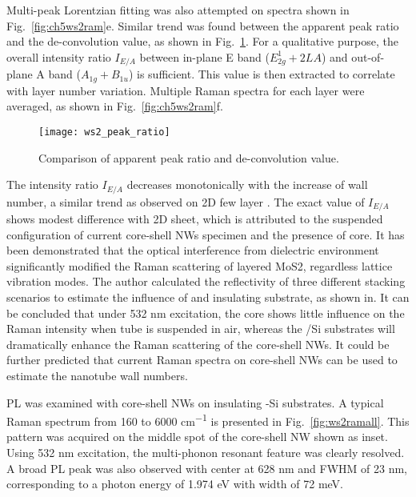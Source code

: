 Multi-peak Lorentzian fitting was also attempted on spectra shown in Fig.~\ref{fig:ch5ws2ram}e. Similar trend was found between the apparent peak ratio and the de-convolution value, as shown in Fig.~\ref{fig:ch5ws2pr}. For a qualitative purpose, the overall intensity ratio $I_{E/A}$ between in-plane E band ($E_{2g}^1+2LA$) and out-of-plane A band ($A_{1g}+B_{1u}$) is sufficient. This value is then extracted to correlate with layer number variation. Multiple Raman spectra for each layer were averaged, as shown in Fig.~\ref{fig:ch5ws2ram}f. 

\begin{figure}[htb]
\centering
\texttt{[image: ws2\_peak\_ratio]}
\caption[Multi-peak Lorentzian fitting on core-shell NWs]{Comparison of apparent peak ratio and de-convolution value.}
\label{fig:ch5ws2pr}
\end{figure}

The intensity ratio $I_{E/A}$ decreases monotonically with the increase of  wall number, a similar trend as observed on 2D few layer . The exact value of $I_{E/A}$ shows modest difference with 2D sheet, which is attributed to the suspended configuration of current core-shell NWs specimen and the presence of  core. It has been demonstrated that the optical interference from dielectric environment significantly modified the Raman scattering of layered MoS2, regardless lattice vibration modes.\cite{Li2012} The author calculated the reflectivity of three different stacking scenarios to estimate the influence of  and insulating substrate, as shown in. It can be concluded that under 532 nm excitation, the  core shows little influence on the Raman intensity when  tube is suspended in air, whereas the /Si substrates will dramatically enhance the Raman scattering of the core-shell NWs. It could be further predicted that current Raman spectra on core-shell NWs can be used to estimate the  nanotube wall numbers. 

PL was examined with core-shell NWs on insulating -Si substrates. A typical Raman spectrum from 160 to 6000 \si{cm^{-1}} is presented in Fig.~\ref{fig:ws2ramall}. This pattern was acquired on the middle spot of the core-shell NW shown as inset. Using 532 nm excitation, the multi-phonon resonant feature was clearly resolved. A broad PL peak was also observed with center at 628 nm and FWHM of 23 nm, corresponding to a photon energy of 1.974 eV with width of 72 meV.  

